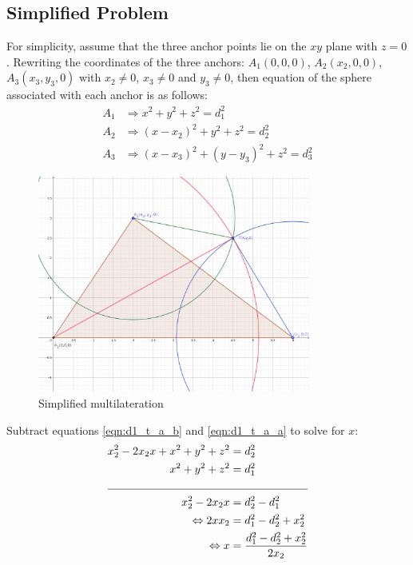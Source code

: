 \documentclass[\main/main.tex]{subfiles}
\begin{document}
\subsection{Simplified Problem}
\label{subsection:multilateration_simplified_problem}
For simplicity, assume that the three anchor points lie on the $xy$ plane with $z = 0$. Rewriting the coordinates of the three anchors: $A_1(0,0,0)$, $A_2(x_2,0,0)$, $A_3(x_3,y_3,0)$ with $x_2 \neq 0$, $x_3 \neq 0$ and $y_3 \neq 0$, then equation of the sphere associated with each anchor is as follows:
\begin{subequations}
    \begin{align}
        A_1 &\Rightarrow  x^2 + y^2 + z^2 = d_1^2 \label{eqn:d1_t_a_a}\\
        A_2 &\Rightarrow (x-x_2)^2 + y^2 + z^2 = d_2^2 \label{eqn:d1_t_a_b}\\
        A_3 &\Rightarrow (x-x_3)^2 + (y-y_3)^2 + z^2 = d_3^2 \label{eqn:d1_t_a_c}
    \end{align}
\end{subequations}
\begin{figure}[H]
    \centering
    \includegraphics[width=0.8\textwidth]{simplified_multilateration.png}
    \caption{Simplified multilateration}
    \label{fig:simplified_multilateration}
\end{figure}
Subtract equations \ref{eqn:d1_t_a_b} and \ref{eqn:d1_t_a_a} to solve for $x$:
\begin{equation}
    \begin{split}
        x_2^2 - 2x_2x + x^2 + y^2 + z^2 &= d_2^2\\
        x^2 + y^2 + z^2 &= d_1^2 \\
        \cline{1-2}
        x_2^2 - 2x_2x &= d_2^2 - d_1^2 \\
        \Leftrightarrow 2xx_2 &=  d_1^2 - d_2^2 + x_2^2 \\
        \Leftrightarrow x &= \frac{d_1^2 - d_2^2 + x_2^2}{2x_2}
    \end{split}
    \label{eqn:simplified_multilateration_x}
\end{equation}
\end{document}
